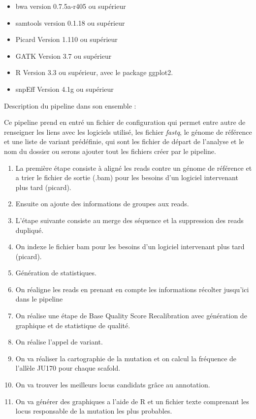 \documentclass[12pt]{article}
\begin{document}
\begin{itemize}
\item bwa version 0.7.5a-r405 ou supérieur
\item samtools version 0.1.18 ou supérieur
\item Picard Version 1.110 ou supérieur
\item GATK Version 3.7 ou supérieur
\item R Version 3.3 ou supérieur, avec le package ggplot2.
\item snpEff Version 4.1g ou supérieur
\end{itemize}

Description du pipeline dans son ensemble :

Ce pipeline prend en entré un fichier de configuration qui permet entre autre de renseigner les liens avec les logiciels utilisé, les fichier \textit{fastq}, le génome de référence et une liste de variant prédéfinie, qui sont les fichier de départ de l'analyse et le nom du dossier ou serons ajouter tout les fichiers créer par le pipeline. 

\begin{enumerate}
\item La première étape consiste à aligné les reads contre un génome de référence et a trier le fichier de sortie (.bam) pour les besoins d'un logiciel intervenant plus tard (picard). 
\item Ensuite on ajoute des informations de groupes aux reads.
\item L'étape suivante consiste au merge des séquence et la suppression des reads dupliqué. 
\item On indexe le fichier bam pour les besoins d'un logiciel intervenant plus tard (picard). 
\item Génération de statistiques.
\item On réaligne les reads en prenant en compte les informations récolter jusqu'ici dans le pipeline
\item On réalise une étape de Base Quality Score Recalibration avec génération de graphique et de statistique de qualité.
\item On réalise l'appel de variant. 
\item On va réaliser la cartographie de la mutation et on calcul la fréquence de l'allèle JU170 pour chaque scafold. 
\item On va trouver les meilleurs locus candidats grâce au annotation. 
\item On va générer des graphiques a l'aide de R et un fichier texte comprenant les locus responsable de la mutation les plus probables. 
\end{enumerate}
\end{document}
